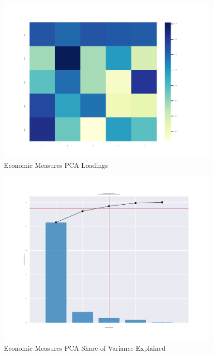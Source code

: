 \documentclass[12pt]{article}
\begin{document}
        \begin{figure}[h!]
            \centering
            \caption{Economic Measures PCA Loadings}
            \label{Econ_Loadings}	
            \includegraphics[width=\linewidth,keepaspectratio=true]{../Output/Figures/Econ_Indicator_Loadings_combined_short.pdf}
        \end{figure}

        \begin{figure}[h!]
            \centering
            \caption{Economic Measures PCA Share of Variance Explained}
            \label{Econ_Share_Explained}	
            \includegraphics[width=\linewidth,keepaspectratio=true]{../Output/Figures/Econ_Indicator_Share_Explained_combined_short.pdf}
        \end{figure}
\end{document}
